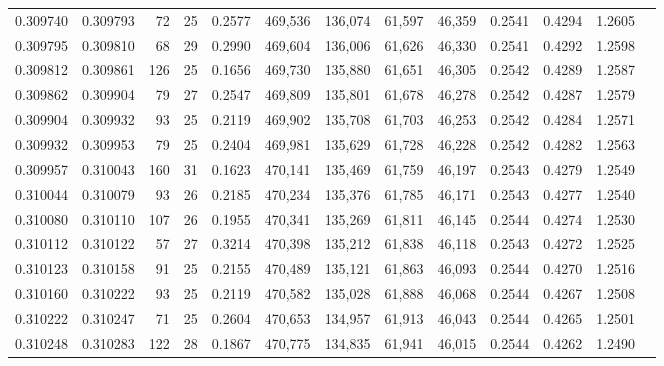 \begin{tabular}{rrrrrrrrrrrrr}
0.309740 & 0.309793 &    72 &  25 &                                     0.2577 & 469,536 & 136,074 &  61,597 &  46,359 & 0.2541 & 0.4294 & 1.2605 \\
0.309795 & 0.309810 &    68 &  29 &                                     0.2990 & 469,604 & 136,006 &  61,626 &  46,330 & 0.2541 & 0.4292 & 1.2598 \\
0.309812 & 0.309861 &   126 &  25 &                                     0.1656 & 469,730 & 135,880 &  61,651 &  46,305 & 0.2542 & 0.4289 & 1.2587 \\
0.309862 & 0.309904 &    79 &  27 &                                     0.2547 & 469,809 & 135,801 &  61,678 &  46,278 & 0.2542 & 0.4287 & 1.2579 \\
0.309904 & 0.309932 &    93 &  25 &                                     0.2119 & 469,902 & 135,708 &  61,703 &  46,253 & 0.2542 & 0.4284 & 1.2571 \\
0.309932 & 0.309953 &    79 &  25 &                                     0.2404 & 469,981 & 135,629 &  61,728 &  46,228 & 0.2542 & 0.4282 & 1.2563 \\
0.309957 & 0.310043 &   160 &  31 &                                     0.1623 & 470,141 & 135,469 &  61,759 &  46,197 & 0.2543 & 0.4279 & 1.2549 \\
0.310044 & 0.310079 &    93 &  26 &                                     0.2185 & 470,234 & 135,376 &  61,785 &  46,171 & 0.2543 & 0.4277 & 1.2540 \\
0.310080 & 0.310110 &   107 &  26 &                                     0.1955 & 470,341 & 135,269 &  61,811 &  46,145 & 0.2544 & 0.4274 & 1.2530 \\
0.310112 & 0.310122 &    57 &  27 &                                     0.3214 & 470,398 & 135,212 &  61,838 &  46,118 & 0.2543 & 0.4272 & 1.2525 \\
0.310123 & 0.310158 &    91 &  25 &                                     0.2155 & 470,489 & 135,121 &  61,863 &  46,093 & 0.2544 & 0.4270 & 1.2516 \\
0.310160 & 0.310222 &    93 &  25 &                                     0.2119 & 470,582 & 135,028 &  61,888 &  46,068 & 0.2544 & 0.4267 & 1.2508 \\
0.310222 & 0.310247 &    71 &  25 &                                     0.2604 & 470,653 & 134,957 &  61,913 &  46,043 & 0.2544 & 0.4265 & 1.2501 \\
0.310248 & 0.310283 &   122 &  28 &                                     0.1867 & 470,775 & 134,835 &  61,941 &  46,015 & 0.2544 & 0.4262 & 1.2490 \\

\end{tabular}
